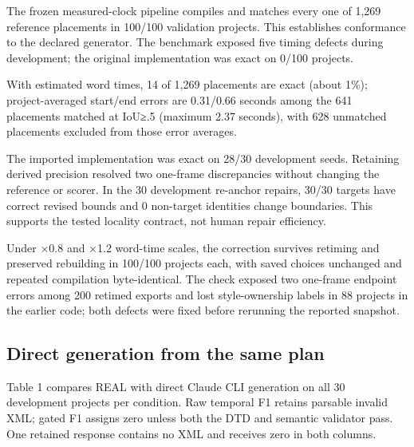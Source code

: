\documentclass{ceurart}
\begin{document}
The frozen measured-clock pipeline compiles and matches every one of
1,269 reference placements in 100/100 validation projects. This
establishes conformance to the declared generator. The benchmark exposed
five timing defects during development; the original implementation was
exact on 0/100 projects.

With estimated word times, 14 of 1,269 placements are exact (about 1\%);
project-averaged start/end errors are 0.31/0.66 seconds among the 641
placements matched at IoU≥.5 (maximum 2.37 seconds), with 628 unmatched
placements excluded from those error averages.

The imported implementation was exact on 28/30 development seeds.
Retaining derived precision resolved two one-frame discrepancies without
changing the reference or scorer. In the 30 development re-anchor
repairs, 30/30 targets have correct revised bounds and 0 non-target
identities change boundaries. This supports the tested locality
contract, not human repair efficiency.

Under ×0.8 and ×1.2 word-time scales, the correction survives retiming
and preserved rebuilding in 100/100 projects each, with saved choices
unchanged and repeated compilation byte-identical. The check exposed two
one-frame endpoint errors among 200 retimed exports and lost
style-ownership labels in 88 projects in the earlier code; both defects
were fixed before rerunning the reported snapshot.

\subsection{Direct generation from the same
plan}\label{direct-generation-from-the-same-plan}

Table 1 compares REAL with direct Claude CLI generation on all 30
development projects per condition. Raw temporal F1 retains parsable
invalid XML; gated F1 assigns zero unless both the DTD and semantic
validator pass. One retained response contains no XML and receives zero
in both columns.
\end{document}
